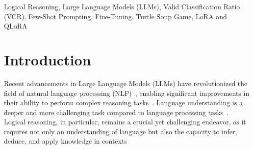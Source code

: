 \documentclass[conference]{IEEEtran}
\begin{document}
\begin{IEEEkeywords}
Logical Reasoning, Large Language Models (LLMs), Valid Classification Ratio (VCR), Few-Shot Prompting, Fine-Tuning, Turtle Soup Game, LoRA and QLoRA
\end{IEEEkeywords}
\section{Introduction}

Recent advancements in Large Language Models (LLMs) have revolutionized the field of natural language processing (NLP)~\cite{cambria2023seven,wang2025review}, enabling significant improvements in their ability to perform complex reasoning tasks~\cite{chen2024large, hadi2024large}. Language understanding is a deeper and more challenging task compared to language processing tasks~\cite{wang2020multi, wang2023mimusa}.  Logical reasoning, in particular, remains a crucial yet challenging endeavor, as it requires not only an understanding of language but also the capacity to infer, deduce, and apply knowledge in contexts \cite{wang2024can}%
\end{document}
